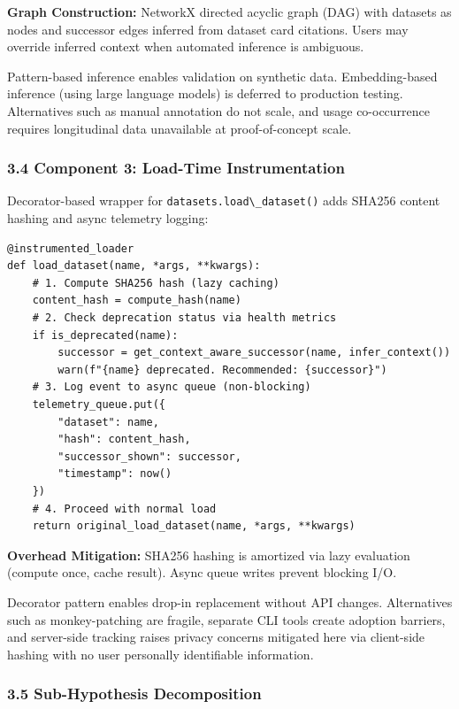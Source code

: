 \textbf{Graph Construction:} NetworkX directed acyclic graph (DAG) with datasets as nodes and successor edges inferred from dataset card citations. Users may override inferred context when automated inference is ambiguous.

Pattern-based inference enables validation on synthetic data. Embedding-based inference (using large language models) is deferred to production testing. Alternatives such as manual annotation do not scale, and usage co-occurrence requires longitudinal data unavailable at proof-of-concept scale.

\subsubsection{3.4 Component 3: Load-Time Instrumentation}

Decorator-based wrapper for \texttt{datasets.load\textbackslash \_dataset()} adds SHA256 content hashing and async telemetry logging:

\begin{verbatim}
@instrumented_loader
def load_dataset(name, *args, **kwargs):
    # 1. Compute SHA256 hash (lazy caching)
    content_hash = compute_hash(name)
    # 2. Check deprecation status via health metrics
    if is_deprecated(name):
        successor = get_context_aware_successor(name, infer_context())
        warn(f"{name} deprecated. Recommended: {successor}")
    # 3. Log event to async queue (non-blocking)
    telemetry_queue.put({
        "dataset": name,
        "hash": content_hash,
        "successor_shown": successor,
        "timestamp": now()
    })
    # 4. Proceed with normal load
    return original_load_dataset(name, *args, **kwargs)
\end{verbatim}

\textbf{Overhead Mitigation:} SHA256 hashing is amortized via lazy evaluation (compute once, cache result). Async queue writes prevent blocking I/O.

Decorator pattern enables drop-in replacement without API changes. Alternatives such as monkey-patching are fragile, separate CLI tools create adoption barriers, and server-side tracking raises privacy concerns mitigated here via client-side hashing with no user personally identifiable information.

\subsubsection{3.5 Sub-Hypothesis Decomposition}

